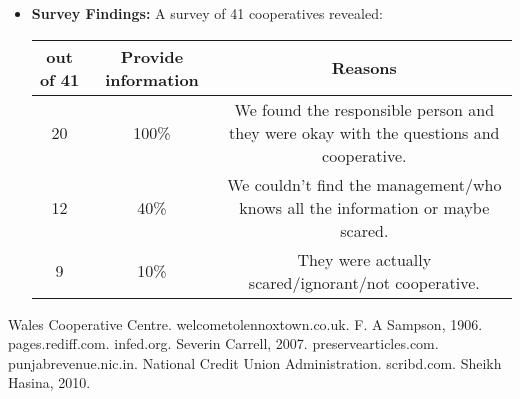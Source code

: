 \begin{itemize}
    \item \textbf{Survey Findings:} A survey of 41 cooperatives revealed:
    \begin{center}
        \begin{tabular}{|c|c|c|}
            \hline
            \textbf{out of 41} & \textbf{Provide information} & \textbf{Reasons} \\
            \hline
            20 & 100\% & We found the responsible person and they were okay with the questions and cooperative. \\
            \hline
            12 & 40\% & We couldn’t find the management/who knows all the information or maybe scared. \\
            \hline
            9 & 10\% & They were actually scared/ignorant/not cooperative. \\
            \hline
        \end{tabular}
        \end{center}

\end{itemize}

\begin{thebibliography}{9}
     Wales Cooperative Centre.
     welcometolennoxtown.co.uk.
     F. A Sampson, 1906.
     pages.rediff.com.
     infed.org.
     Severin Carrell, 2007.
     preservearticles.com.
     punjabrevenue.nic.in.
     National Credit Union Administration.
     scribd.com.
     Sheikh Hasina, 2010.
\end{thebibliography}